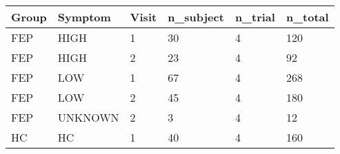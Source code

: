 \begin{tabular}{llllll}
Group & Symptom & Visit & n_subject & n_trial & n_total \\ 
\hline 
FEP & HIGH & 1 & 30 & 4 & 120 \\ 
FEP & HIGH & 2 & 23 & 4 & 92 \\ 
FEP & LOW & 1 & 67 & 4 & 268 \\ 
FEP & LOW & 2 & 45 & 4 & 180 \\ 
FEP & UNKNOWN & 2 & 3 & 4 & 12 \\ 
HC & HC & 1 & 40 & 4 & 160 \\ 
\hline 
\end{tabular}